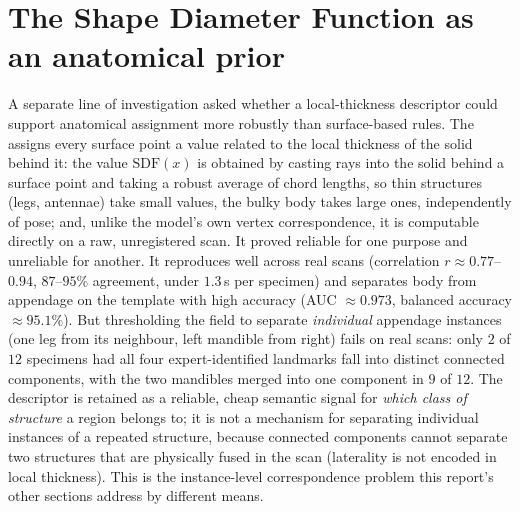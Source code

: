 \section{The Shape Diameter Function as an anatomical prior}

A separate line of investigation asked whether a local-thickness descriptor could
support anatomical assignment more robustly than surface-based rules. The
~\cite{sdf} assigns every surface point a
value related to the local thickness of the solid behind it: the value $\mathrm{SDF}(x)$ is obtained by casting rays into the solid
behind a surface point and taking a robust average of chord lengths, so thin
structures (legs, antennae) take small values, the bulky body takes large
ones, independently of pose; and, unlike the model's own vertex
correspondence, it is computable directly on a raw, unregistered scan. It
proved reliable for one purpose and unreliable for another. It reproduces
well across real scans (correlation $r\approx0.77$--$0.94$, $87$--$95\%$
agreement, under $1.3$\,s per specimen) and separates body from appendage on
the template with high accuracy (AUC $\approx0.973$, balanced accuracy
$\approx95.1\%$). But thresholding the field to separate \emph{individual}
appendage instances (one leg from its neighbour, left mandible from right)
fails on real scans: only $2$ of $12$ specimens had all four
expert-identified landmarks fall into distinct connected components, with
the two mandibles merged into one component in $9$ of $12$. The descriptor
is retained as a reliable, cheap semantic signal for \emph{which class of
structure} a region belongs to; it is not a mechanism for separating
individual instances of a repeated structure, because connected components cannot separate two
structures that are physically fused in the scan (laterality is not encoded in local
thickness). This is the instance-level correspondence problem this report's other sections address by different
means.
